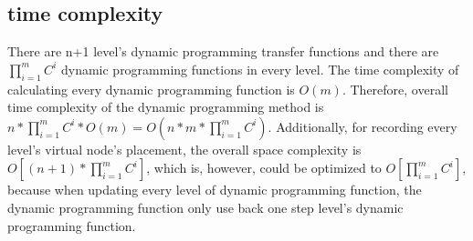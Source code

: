 \subsection{time complexity}

There are n+1 level's dynamic programming  transfer functions and there are $\prod_{i=1}^{m}C^i$ dynamic programming functions in every level. The time complexity of calculating every dynamic programming function is $O(m)$. Therefore, overall time complexity of the dynamic programming method is $n*\prod_{i=1}^{m}C^i*O(m)=O(n*m*\prod_{i=1}^{m}C^i)$. Additionally, for recording every level's virtual node's placement, the overall space complexity is $O[(n+1)*\prod_{i=1}^{m}C^i]$, which is, however, could be optimized to $O[\prod_{i=1}^{m}C^i]$, because when updating every level of dynamic programming function, the dynamic programming function only use back one step level's dynamic programming function.


